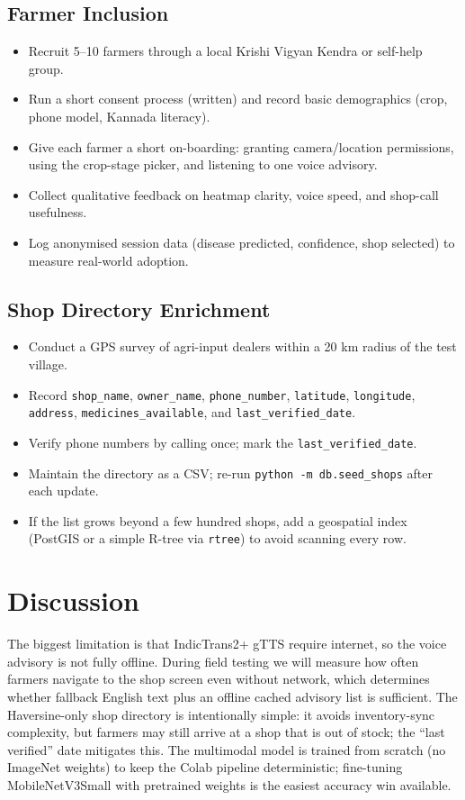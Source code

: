 \documentclass[11pt]{article}
\begin{document}
\subsection{Farmer Inclusion}
\begin{itemize}
    \item Recruit 5--10 farmers through a local Krishi Vigyan Kendra or self-help group.
    \item Run a short consent process (written) and record basic demographics (crop, phone model, Kannada literacy).
    \item Give each farmer a short on-boarding: granting camera/location permissions, using the crop-stage picker, and listening to one voice advisory.
    \item Collect qualitative feedback on heatmap clarity, voice speed, and shop-call usefulness.
    \item Log anonymised session data (disease predicted, confidence, shop selected) to measure real-world adoption.
\end{itemize}

\subsection{Shop Directory Enrichment}
\label{sec:shop-details}
\begin{itemize}
    \item Conduct a GPS survey of agri-input dealers within a 20 km radius of the test village.
    \item Record \texttt{shop\_name}, \texttt{owner\_name}, \texttt{phone\_number}, \texttt{latitude}, \texttt{longitude}, \texttt{address}, \texttt{medicines\_available}, and \texttt{last\_verified\_date}.
    \item Verify phone numbers by calling once; mark the \texttt{last\_verified\_date}.
    \item Maintain the directory as a CSV; re-run \texttt{python -m db.seed\_shops} after each update.
    \item If the list grows beyond a few hundred shops, add a geospatial index (PostGIS or a simple R-tree via \texttt{rtree}) to avoid scanning every row.
\end{itemize}

\section{Discussion}
The biggest limitation is that IndicTrans2+ gTTS require internet, so the voice advisory is not fully offline. During field testing we will measure how often farmers navigate to the shop screen even without network, which determines whether fallback English text plus an offline cached advisory list is sufficient. The Haversine-only shop directory is intentionally simple: it avoids inventory-sync complexity, but farmers may still arrive at a shop that is out of stock; the ``last verified'' date mitigates this. The multimodal model is trained from scratch (no ImageNet weights) to keep the Colab pipeline deterministic; fine-tuning MobileNetV3Small with pretrained weights is the easiest accuracy win available.
\end{document}
